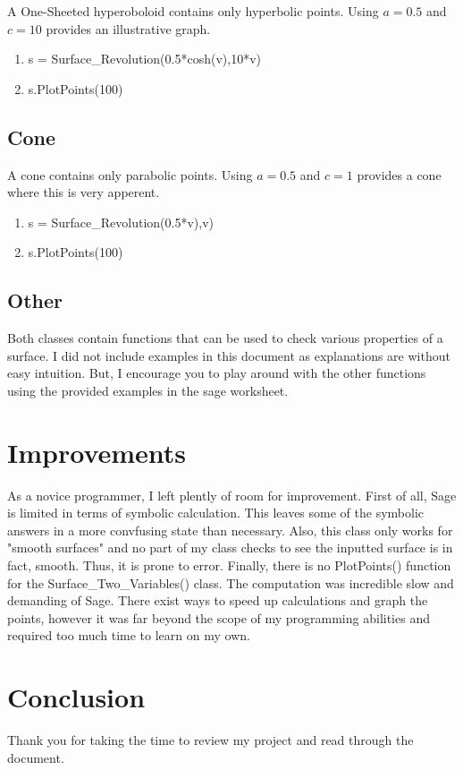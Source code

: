 \documentclass{article}
\begin{document}
A One-Sheeted hyperoboloid contains only hyperbolic points. Using $a=0.5$ and $c=10$ provides an illustrative graph.


\begin{enumerate}
\item s = Surface\_Revolution(0.5*cosh(v),10*v)
\item s.PlotPoints(100)
\end{enumerate}

\subsection{Cone}

A cone contains only parabolic points. Using $a=0.5$ and $c=1$ provides a cone where this is very apperent. 

\begin{enumerate}
\item s = Surface\_Revolution(0.5*v),v)
\item s.PlotPoints(100)
\end{enumerate}

\subsection{Other}
Both classes contain functions that can be used to check various properties of a surface. I did not include examples in this document as explanations are without easy intuition. But, I encourage you to play around with the other functions using the provided examples in the sage worksheet.

\section{Improvements}
As a novice programmer, I left plently of room for improvement. First of all, Sage is limited in terms of symbolic calculation. This leaves some of the symbolic answers in a more convfusing state than necessary. Also, this class only works for "smooth surfaces" and no part of my class checks to see the inputted surface is in fact, smooth. Thus, it is prone to error. Finally, there is no PlotPoints() function for the Surface_Two_Variables() class. The computation was incredible slow and demanding of Sage. There exist ways to speed up calculations and graph the points, however it was far beyond the scope of my programming abilities and required too much time to learn on my own.

\section{Conclusion}
Thank you for taking the time to review my project and read through the document.
\end{document}
